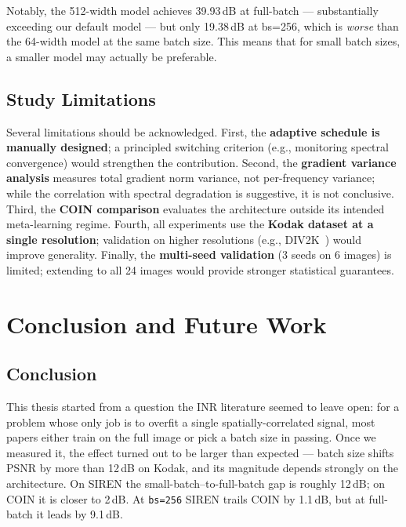 \documentclass[a4paper,oneside,11pt,english]{scrartcl}
\begin{document}
Notably, the 512-width model achieves 39.93\,dB at full-batch --- substantially
exceeding our default model --- but only 19.38\,dB at bs=256, which is
\emph{worse} than the 64-width model at the same batch size.  This means
that for small batch sizes, a smaller model may actually be preferable.

\subsection{Study Limitations}
\label{sec:limitations}

Several limitations should be acknowledged.  First, the \textbf{adaptive
schedule is manually designed}; a principled switching criterion (e.g.,
monitoring spectral convergence) would strengthen the contribution.  Second,
the \textbf{gradient variance analysis} measures total gradient norm
variance, not per-frequency variance; while the correlation with spectral
degradation is suggestive, it is not conclusive.  Third, the \textbf{COIN
comparison} evaluates the architecture outside its intended meta-learning
regime.  Fourth, all experiments use the \textbf{Kodak dataset at a single
resolution}; validation on higher resolutions
(e.g., DIV2K~\cite{agustsson2017div2k}) would improve generality.  Finally, the \textbf{multi-seed validation} (3 seeds on 6
images) is limited; extending to all 24 images would provide stronger
statistical guarantees.


\section{Conclusion and Future Work}
\label{sec:conclusion}

\subsection{Conclusion}

This thesis started from a question the INR literature seemed to leave
open: for a problem whose only job is to overfit a single
spatially-correlated signal, most papers either train on the full image
or pick a batch size in passing.  Once we measured it, the effect turned
out to be larger than expected --- batch size shifts PSNR by more than
12\,dB on Kodak, and its magnitude depends strongly on the architecture.
On SIREN the small-batch--to-full-batch gap is roughly 12\,dB; on COIN it
is closer to 2\,dB.  At \texttt{bs=256} SIREN trails COIN by 1.1\,dB,
but at full-batch it leads by 9.1\,dB.
\end{document}
